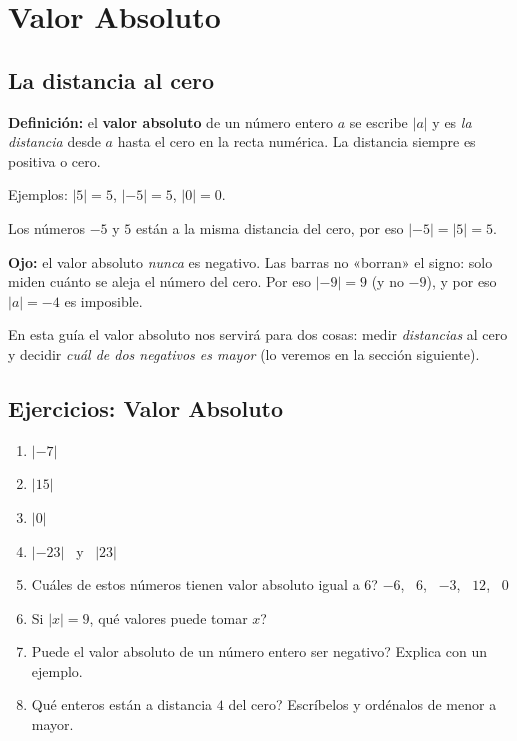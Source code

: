 \documentclass[12pt, letterpaper]{article}
\begin{document}
\section{Valor Absoluto}

\subsection{La distancia al cero}

\begin{cuadroteoria}
  \textbf{Definición:} el \textbf{valor absoluto} de un número entero $a$ se escribe $|a|$ y es \emph{la distancia} desde $a$ hasta el cero en la recta numérica. La distancia siempre es positiva o cero.

  Ejemplos: $|5| = 5$, $|-5| = 5$, $|0| = 0$.
\end{cuadroteoria}

\noindent Los números $-5$ y $5$ están a la misma distancia del cero, por eso $|-5| = |5| = 5$.

\begin{cuadroadvertencia}
  \textbf{Ojo:} el valor absoluto \emph{nunca} es negativo. Las barras no «borran» el signo: solo miden cuánto se aleja el número del cero. Por eso $|-9| = 9$ (y no $-9$), y por eso $|a| = -4$ es imposible.
\end{cuadroadvertencia}

\noindent En esta guía el valor absoluto nos servirá para dos cosas: medir \emph{distancias} al cero y decidir \emph{cuál de dos negativos es mayor} (lo veremos en la sección siguiente).

\subsection{Ejercicios: Valor Absoluto}

\begin{enumerate}[leftmargin=*, start=7]
  \item \facil{} $|-7|$

  \item \facil{} $|15|$

  \item \facil{} $|0|$

  \item \facil{} $|-23|$ \ y \ $|23|$

  \item \medio{} \textquestiondown Cuáles de estos números tienen valor absoluto igual a $6$? \quad $-6$, \ $6$, \ $-3$, \ $12$, \ $0$

  \item \medio{} Si $|x| = 9$, \textquestiondown qué valores puede tomar $x$?

  \item \medio{} \textquestiondown Puede el valor absoluto de un número entero ser negativo? Explica con un ejemplo.

  \item \dificil{} \textquestiondown Qué enteros están a distancia $4$ del cero? Escríbelos y ordénalos de menor a mayor.
\end{enumerate}
\end{document}
